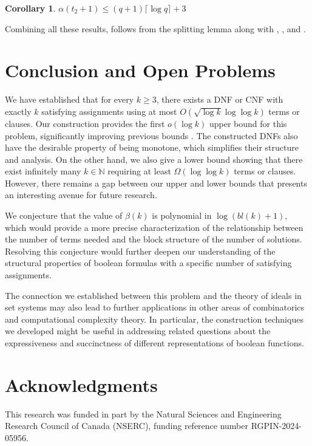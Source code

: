 \documentclass[11pt,a4paper]{article}
\newtheorem{corollary}[theorem]{Corollary}
\theoremstyle{definition}
\begin{document}
\begin{corollary}\label{t2corol}
	$\alpha(t_2+1)\leq (q+1)\lceil \log{q} \rceil+3$    
\end{corollary}

Combining all these results,  follows from the 
splitting lemma along with , , and 
.

%


%

%
%
\section{Conclusion and Open Problems}\label{sec:conclusion}

We have established that for every $k \geq 3$, there exists a DNF or CNF 
with exactly $k$ satisfying assignments using at most $O(\sqrt{\log k}
\log\log k)$ terms or clauses. Our construction provides the first 
$o(\log k)$ upper bound for this problem, significantly improving previous 
bounds \cite{Meel15}. The constructed DNFs also have the desirable property of being 
monotone, which simplifies their structure and analysis. On the other hand, we also give a lower bound showing that there exist infinitely many $k \in \mathbb{N}$ 
requiring at least $\Omega(\log\log k)$ terms or clauses. However, there 
remains a gap between our upper and lower bounds that presents an 
interesting avenue for future research.

We conjecture that the value of $\beta(k)$ is polynomial in 
$\log(bl(k) + 1)$, which would provide a more precise characterization 
of the relationship between the number of terms needed and the block 
structure of the number of solutions. Resolving this conjecture would 
further deepen our understanding of the structural properties of boolean 
formulas with a specific number of satisfying assignments.

The connection we established between this problem and the theory of ideals 
in set systems may also lead to further applications in other areas of 
combinatorics and computational complexity theory. In particular, the 
construction techniques we developed might be useful in addressing related 
questions about the expressiveness and succinctness of different 
representations of boolean functions.
%

%
\section*{Acknowledgments}
This research was funded in part by the Natural Sciences and Engineering Research Council
of Canada (NSERC), funding reference number RGPIN-2024-05956.
\end{document}
